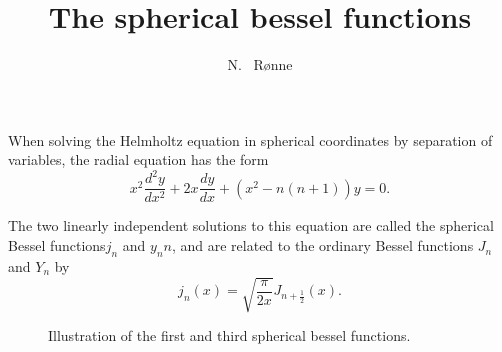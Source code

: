 \documentclass[twocolumn]{article}
\title{The spherical bessel functions}
\author{N. ~R\o nne}
\begin{document}
\maketitle

\noindent
When solving the Helmholtz equation in spherical coordinates by separation of variables, the radial equation has the form
\begin{equation}
  x^2 \frac{d^2 y}{dx^2} + 2x \frac{dy}{dx} + \left(x^2 - n(n + 1)\right) y = 0.
\end{equation}

The two linearly independent solutions to this equation are called the spherical Bessel functions$j_n$ and $y_nn$, and are related to the ordinary Bessel functions $J_n$ and $Y_n$ by
\begin{equation}
  j_n(x) = \sqrt{\frac{\pi}{2x}} J_{n+\frac{1}{2}}(x).
\end{equation}


\begin{figure}[h]
  
  \caption{Illustration of the first and third spherical bessel functions.}
\end{figure}
\end{document}
